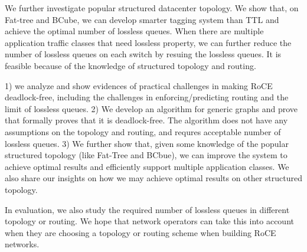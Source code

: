 We further investigate popular structured datacenter topology. We show that, on Fat-tree and BCube, we can develop 
smarter tagging system than TTL and achieve the optimal number of lossless queues.
When there are multiple application traffic classes that need lossless property, we can further reduce the number of
lossless queues on each switch by resuing the lossless queues. It is feasible because of the knowledge of structured topology and routing. 


 1) we analyze and show evidences of practical challenges in making RoCE deadlock-free, including 
the challenges in enforcing/predicting routing and the limit of lossless queues. 2) We develop an algorithm for generic graphs 
and prove that formally proves that it is deadlock-free. The algorithm does not have any assumptions on the topology and routing,
and requres acceptable number of lossless queues. 3) We further show that, given some knowledge of the popular structured topology
(like Fat-Tree and BCbue), we can improve the system to achieve optimal results and efficiently support multiple application classes.  
We also share our insights on how we may achieve optimal results on other structured topology.  


 In evaluation, we also study the required number of
lossless queues in different topology or routing. We hope that network operators can take this into account when they are choosing a
topology or routing scheme when building RoCE networks.

